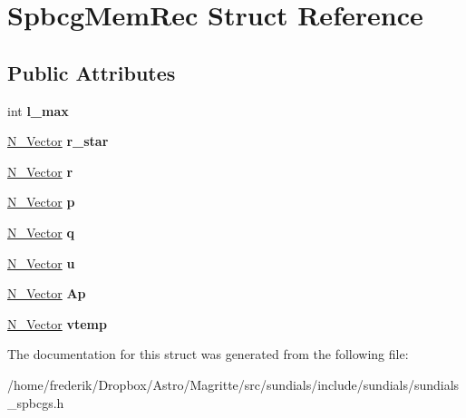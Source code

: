 \hypertarget{structSpbcgMemRec}{}\section{Spbcg\+Mem\+Rec Struct Reference}
\label{structSpbcgMemRec}
\subsection*{Public Attributes}
\begin{DoxyCompactItemize}
\item 
\mbox{\label{structSpbcgMemRec_a7235d040a000ed79a07a35032d5c19b9}} 
int {\bfseries l\+\_\+max}
\item 
\mbox{\label{structSpbcgMemRec_a8a821342253dbbf2acd5537aa583546a}} 
\mbox{\hyperlink{struct__generic__N__Vector}{N\+\_\+\+Vector}} {\bfseries r\+\_\+star}
\item 
\mbox{\label{structSpbcgMemRec_a4c6e50b79fe86cf152ce1026ee4e6d58}} 
\mbox{\hyperlink{struct__generic__N__Vector}{N\+\_\+\+Vector}} {\bfseries r}
\item 
\mbox{\label{structSpbcgMemRec_a7dce933713b8aad10c6f436f86c054c5}} 
\mbox{\hyperlink{struct__generic__N__Vector}{N\+\_\+\+Vector}} {\bfseries p}
\item 
\mbox{\label{structSpbcgMemRec_aeecc3601a434a10ba63989abc631f257}} 
\mbox{\hyperlink{struct__generic__N__Vector}{N\+\_\+\+Vector}} {\bfseries q}
\item 
\mbox{\label{structSpbcgMemRec_a17bdae2f392e66b0f73092fba621defd}} 
\mbox{\hyperlink{struct__generic__N__Vector}{N\+\_\+\+Vector}} {\bfseries u}
\item 
\mbox{\label{structSpbcgMemRec_aa48474340472b8ee8d7d52df99f159ba}} 
\mbox{\hyperlink{struct__generic__N__Vector}{N\+\_\+\+Vector}} {\bfseries Ap}
\item 
\mbox{\label{structSpbcgMemRec_a134add32d68f2eb0dc1f9683a9484013}} 
\mbox{\hyperlink{struct__generic__N__Vector}{N\+\_\+\+Vector}} {\bfseries vtemp}
\end{DoxyCompactItemize}


The documentation for this struct was generated from the following file\+:\begin{DoxyCompactItemize}
\item 
/home/frederik/\+Dropbox/\+Astro/\+Magritte/src/sundials/include/sundials/sundials\+\_\+spbcgs.\+h\end{DoxyCompactItemize}
